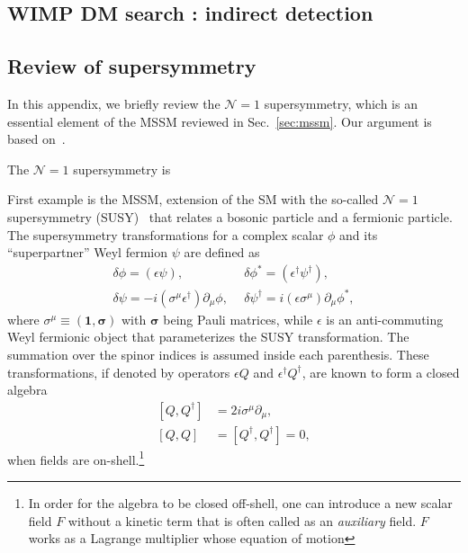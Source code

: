 \documentclass[12pt,twoside,book]{article}
\begin{document}
\subsection{WIMP DM search : indirect detection}

\clearpage

\begin{appendices}

\section{Review of supersymmetry}
 
In this appendix, we briefly review the $\mathcal{N}=1$ supersymmetry,
which is an essential element of the MSSM reviewed in
Sec.~\ref{sec:mssm}.  Our argument is based on~\cite{Wess:320631,
Martin:1997ns}.

The $\mathcal{N}=1$ supersymmetry is 

First example is the MSSM, extension of the SM with the so-called
$\mathcal{N}=1$ supersymmetry (SUSY)~\cite{Wess:320631, Martin:1997ns}
that relates a bosonic particle and a fermionic particle.  The
supersymmetry transformations for a complex scalar $\phi$ and its
``superpartner'' Weyl fermion $\psi$ are defined as
\begin{align}
 \delta \phi = \left( \epsilon \psi \right),
 ~&~
 \delta \phi^{*} = \left( \epsilon^\dagger \psi^\dagger \right),\\
 \delta \psi = -i \left(\sigma^\mu \epsilon^\dagger \right) \partial_\mu \phi,
 ~&~
 \delta \psi^\dagger = i \left(\epsilon \sigma^\mu \right) \partial_\mu \phi^{*},
\end{align}
where $\sigma^\mu \equiv (\bm{1}, \bm{\sigma})$ with $\bm{\sigma}$
being Pauli matrices, while $\epsilon$ is an anti-commuting Weyl
fermionic object that parameterizes the SUSY transformation.  The
summation over the spinor indices is assumed inside each parenthesis.
These transformations, if denoted by operators $\epsilon Q$ and
$\epsilon^\dagger Q^\dagger$, are known to form a closed algebra
\begin{align}
 \left[ Q, Q^\dagger \right] &= 2 i \sigma^\mu \partial_\mu,\\
 \left[ Q, Q \right] &= \left[ Q^\dagger, Q^\dagger \right] = 0,
\end{align}
when fields are on-shell.\footnote{
In order for the algebra to be closed off-shell, one can introduce a
new scalar field $F$ without a kinetic term that is often called as an
\textit{auxiliary} field.  $F$ works as a Lagrange multiplier whose
equation of motion }

\end{appendices}

\clearpage



\end{document}
